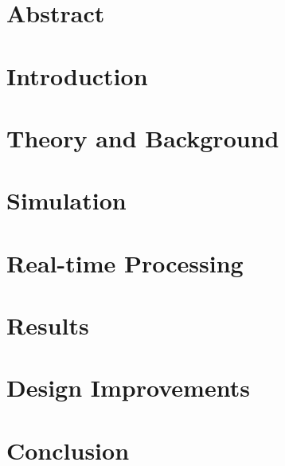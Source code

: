 \documentclass[a4paper, english, twoside, 12pt]{article}
\begin{document}
%

\thispagestyle{empty}

\pagebreak

\restoregeometry
{}

\listoftodos

\pagebreak

\glsunsetall
\tableofcontents
\pagebreak
\listoffigures
\glsresetall
\pagebreak

\section{Abstract}

\pagebreak
\section{Introduction}

\pagebreak
\section{Theory and Background}

\pagebreak
\section{Simulation}

\pagebreak
\section{Real-time Processing}

\pagebreak
\section{Results}

\pagebreak
\section{Design Improvements}

\pagebreak
%
\section{Conclusion}

\pagebreak
\end{document}

